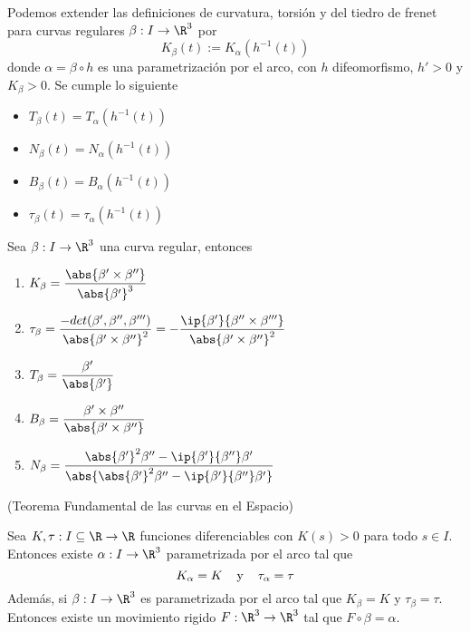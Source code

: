 \documentclass{article}
\begin{document}
\noindent Podemos extender las definiciones de curvatura, torsión y del tiedro de frenet para
curvas regulares $\beta: I\to\R^{3}$ por
\begin{equation*}
    K_{\beta}(t):=K_{\alpha}(h^{-1}(t))
\end{equation*}
donde $\alpha=\beta\circ h$ es una parametrización por el arco, con $h$ difeomorfismo, $h'>0$ y
$K_{\beta}>0$. Se cumple lo siguiente
\begin{itemize}
    \item $T_{\beta}(t)=T_{\alpha}(h^{-1}(t))$
    \item $N_{\beta}(t)=N_{\alpha}(h^{-1}(t))$
    \item $B_{\beta}(t)=B_{\alpha}(h^{-1}(t))$
    \item $\tau_{\beta}(t)=\tau_{\alpha}(h^{-1}(t))$
\end{itemize}

\begin{prop}
    Sea $\beta: I\to\R^{3}$ una curva regular, entonces
    \begin{enumerate}
        \item $K_{\beta}=\dfrac{\abs{\beta'\times\beta''}}{\abs{\beta'}^{3}}$
        \item $\tau_{\beta}=\dfrac{-det(\beta',\beta'',\beta''')}{\abs{\beta'\times\beta''}^{2}}=
        -\dfrac{\ip{\beta'}{\beta''\times\beta'''}}{\abs{\beta'\times\beta''}^{2}}$
        \item $T_{\beta}=\dfrac{\beta'}{\abs{\beta'}}$
        \item $B_{\beta}=\dfrac{\beta'\times\beta''}{\abs{\beta'\times\beta''}}$
        \item $N_{\beta}=\dfrac{\abs{\beta'}^{2}\beta''-\ip{\beta'}{\beta''}\beta'}
        {\abs{\abs{\beta'}^{2}\beta''-\ip{\beta'}{\beta''}\beta'}}$
    \end{enumerate}
\end{prop}

\begin{teo}
    (Teorema Fundamental de las curvas en el Espacio)
    
    Sea $K,\tau: I\subseteq\R\to\R$ funciones diferenciables con $K(s)>0$ para todo $s\in I$.
    Entonces existe $\alpha:I\to\R^{3}$ parametrizada por el arco tal que
    \begin{equation*}
        K_{\alpha}=K\hspace{4mm}\text{y}\hspace{4mm}\tau_{\alpha}=\tau
    \end{equation*}
    Además, si $\beta:I\to\R^{3}$ es parametrizada por el arco tal que $K_{\beta}=K$ y 
    $\tau_{\beta}=\tau$. Entonces existe un movimiento rigido $F:\R^{3}\to\R^{3}$ tal que
    $F\circ\beta=\alpha$.
\end{teo}
\end{document}

